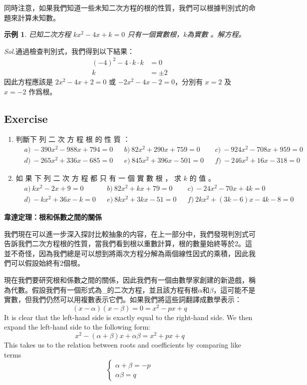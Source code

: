 \documentclass[12pt]{article}
\newtheorem{example}{示例}
\begin{document}
    同時注意，如果我們知道一些未知二次方程的根的性質，我們可以根據判別式的命題來計算未知數。

    \begin{example}
        已知二次方程 $kx^2-4x+k=0$ 只有一個實數根，$k$為實數 。解方程。
    \end{example}

    \textit{ Sol.}通過檢查判別式，我們得到以下結果：\begin{align*}
        (-4)^2-4\cdot k\cdot k&=0\\
        k&=\pm 2
    \end{align*}
    \indent \indent 因此方程應該是 $2x^2-4x+2=0$ 或 $-2x^2-4x-2=0$，分別有 $x=2$ 及 $x=-2$ 作爲根。

    \subsection*{Exercise}
    \begin{enumerate}
        \item 判斷下 列 二 次 方 程 根 的 性 質 ：\begin{align*}
            &a)\ -390x^2-988x+794=0&&b)\ 82x^2+290x+759=0&&c)\ -924x^2-708x+959=0\\
            &d)\ -265x^2+336x-685=0&&e)\ 845x^2+396x-501=0&&f)\ -246x^2+16x-318=0
        \end{align*}
        \item 如 果 下 列 二 次 方 程 都 只 有 一 個 實 數 根 ， 求 $k$ 的 值 。\begin{align*}
            &a)\ kx^2-2x+9=0&&b)\ 82x^2+kx+79=0&&c)\ -24x^2-70x+4k=0\\
            &d)\ -kx^2+36x-k=0&&e)\ 8kx^2+3kx-51=0&&f)\ 2kx^2+(3k-6)x-4k-8=0
        \end{align*}
    \end{enumerate}

    \begin{center}
        \textbf{韋達定理：根和係數之間的關係}
    \end{center}

    我們現在可以進一步深入探討比較抽象的内容，在上一部分中，我們發現判別式可告訴我們二次方程根的性質，當我們看到根以重數計算，根的數量始終等於2。這並不奇怪，因為我們總是可以想到將兩次方程分解為兩個線性因式的乘積，因此我們可以假設始終有2個根。

    現在我們要研究根和係數之間的關係，因此我們有一個由數學家創建的新遊戲，稱為代數。假設我們有一個形式為_的二次方程，並且該方程有根$\alpha$和$\beta$，這可能不是實數，但我們仍然可以用複數表示它們。如果我們將這些詞翻譯成數學表示： $$(x-\alpha)(x-\beta)=0=x^2-px+q$$ It is clear that the left-hand side is exactly equal to the right-hand side. We then expand the left-hand side to the following form: $$x^2-(\alpha+\beta)x+\alpha\beta=x^2+px+q$$ This takes us to the relation between roots and coefficients by comparing like terms $$\begin{cases}
        \alpha+\beta=-p\\ 
        \alpha\beta=q
    \end{cases}$$
\end{document}
